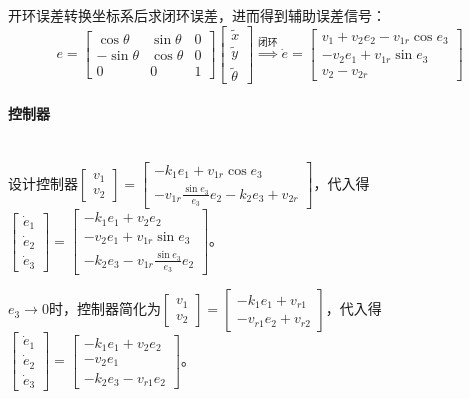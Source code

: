 \documentclass[
12pt, %
a4paper, 
oneside, %
headinclude,footinclude, %
]{scrartcl}
\begin{document}
开环误差转换坐标系后求闭环误差，进而得到辅助误差信号：
$$ 
e = \begin{bmatrix} \cos\theta & \sin\theta & 0 \\ -\sin\theta & \cos\theta & 0 \\ 0 & 0 & 1 \end{bmatrix} \begin{bmatrix} \tilde{x} \\ \tilde{y} \\ \tilde{\theta} \end{bmatrix}
\overset{\text{闭环}}{\Longrightarrow}
\dot{e} = \begin{bmatrix} v_1 + v_2 e_2 - v_{1r} \cos e_3 \\ - v_2 e_1 + v_{1r} \sin e_3 \\ v_2 - v_{2r} \end{bmatrix} 
$$
\paragraph{控制器}~\\

设计控制器$ \begin{bmatrix} v_1 \\ v_2 \end{bmatrix} = \begin{bmatrix} -k_1 e_1 + v_{1r} \cos e_3 \\ -v_{1r} \frac{\sin e_3}{e_3} e_2 - k_2 e_3 + v_{2r} \end{bmatrix} $，代入得$ \begin{bmatrix} \dot{e}_1 \\ \dot{e}_2 \\ \dot{e}_3 \end{bmatrix} = \begin{bmatrix} -k_1 e_1 + v_2 e_2 \\ -v_2 e_1 + v_{1r} \sin e_3 \\ -k_2 e_3 - v_{1r} \frac{\sin e_3}{e_3} e_2 \end{bmatrix} $。

$ e_3 \to 0 $时，控制器简化为$ \begin{bmatrix} v_1 \\ v_2 \end{bmatrix} = \begin{bmatrix} -k_1 e_1 + v_{r1} \\ -v_{r1}  e_2 + v_{r2} \end{bmatrix} $，代入得$ \begin{bmatrix} \dot{e}_1 \\ \dot{e}_2 \\ \dot{e}_3 \end{bmatrix} = \begin{bmatrix} -k_1 e_1 + v_2 e_2 \\ -v_2 e_1 \\ -k_2 e_3 - v_{r1} e_2 \end{bmatrix} $。
\end{document}
